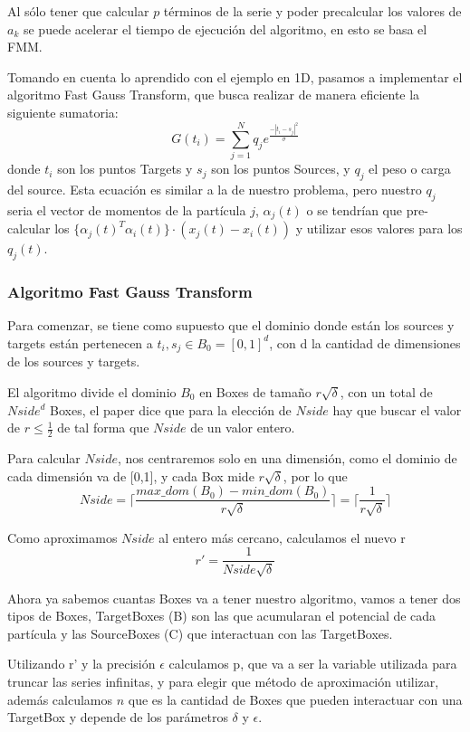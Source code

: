 \documentclass[letter, 10pt]{article}
\begin{document}
Al sólo tener que calcular $p$ términos de la serie y poder precalcular los valores de $a_k$ se puede acelerar el tiempo de ejecución del algoritmo, en esto se basa el FMM.

Tomando en cuenta lo aprendido con el ejemplo en 1D, pasamos a implementar el algoritmo Fast Gauss Transform, que busca realizar de manera eficiente la siguiente sumatoria:
\begin{equation}
G(t_i) = \sum_{j=1}^N q_j e^{\frac{-|t_i - s_j|^2}{\sigma}}
\end{equation}
donde $t_i$ son los puntos Targets y $s_j$ son los puntos Sources, y $q_j$ el peso o carga del source. Esta ecuación es similar a la de nuestro problema, pero nuestro $q_j$ seria el vector de momentos de la partícula $j$, $\alpha_j(t)$ o se tendrían que pre-calcular los $\{\alpha_j(t)^T \alpha_i(t) \} \cdot (x_j(t) - x_i(t)) $ y utilizar esos valores para los $q_j(t)$.

\subsubsection{Algoritmo Fast Gauss Transform}
Para comenzar, se tiene como supuesto que el dominio donde están los sources y targets están pertenecen a $t_i,s_j \in B_0 = [0,1]^d$, con d la cantidad de dimensiones de los sources y targets.

El algoritmo divide el dominio $B_0$ en Boxes de tamaño $r\sqrt{\delta}$, con un total de $Nside^d$ Boxes, el paper dice que para la elección de $Nside$ hay que buscar el valor de $r \leq \frac{1}{2}$ de tal forma que $Nside$ de un valor entero.

Para calcular $Nside$, nos centraremos solo en una dimensión, como el dominio de cada dimensión va de [0,1], y cada Box mide $r\sqrt{\delta}$, por lo que 
$$Nside = \lceil{\frac{max\_dom(B_0) - min\_dom(B_0)}{r\sqrt{\delta}}\rceil} = \lceil{\frac{1}{r\sqrt{\delta}}\rceil}$$

Como aproximamos $Nside$ al entero más cercano, calculamos el nuevo r
$$ r' = \frac{1}{Nside \sqrt{\delta}}$$

Ahora ya sabemos cuantas Boxes va a tener nuestro algoritmo, vamos a tener dos tipos de Boxes, TargetBoxes (B) son las que acumularan el potencial de cada partícula y  las SourceBoxes (C) que interactuan con las TargetBoxes. 

Utilizando r' y la precisión $\epsilon$ calculamos p, que va a ser la variable utilizada para truncar las series infinitas, y para elegir que método de aproximación utilizar, además calculamos $n$ que es la cantidad de Boxes que pueden interactuar con una TargetBox y depende de los parámetros $\delta$ y $\epsilon$.
\end{document}
